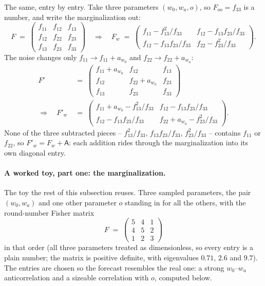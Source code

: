 \documentclass[11pt]{article}
\begin{document}
The same, entry by entry.  Take three parameters $(w_0, w_a, o)$, so
$F_{oo} = f_{33}$ is a number, and write the marginalization out:
\begin{equation*}
  F \;=\;
  \begin{pmatrix}
    f_{11} & f_{12} & f_{13} \\
    f_{12} & f_{22} & f_{23} \\
    f_{13} & f_{23} & f_{33}
  \end{pmatrix}
  \quad\Longrightarrow\quad
  F_w \;=\;
  \begin{pmatrix}
    f_{11} - f_{13}^2/f_{33} & f_{12} - f_{13}f_{23}/f_{33} \\
    f_{12} - f_{13}f_{23}/f_{33} & f_{22} - f_{23}^2/f_{33}
  \end{pmatrix} .
\end{equation*}
The noise changes only $f_{11} \to f_{11} + a_{w_0}$ and
$f_{22} \to f_{22} + a_{w_a}$:
\begin{align*}
  F' \;&=\;
  \begin{pmatrix}
    f_{11} + a_{w_0} & f_{12} & f_{13} \\
    f_{12} & f_{22} + a_{w_a} & f_{23} \\
    f_{13} & f_{23} & f_{33}
  \end{pmatrix}
  \\
  \Longrightarrow\quad
  F'_w \;&=\;
  \begin{pmatrix}
    f_{11} + a_{w_0} - f_{13}^2/f_{33} &
    f_{12} - f_{13}f_{23}/f_{33} \\
    f_{12} - f_{13}f_{23}/f_{33} &
    f_{22} + a_{w_a} - f_{23}^2/f_{33}
  \end{pmatrix} .
\end{align*}
None of the three subtracted pieces -- $f_{13}^2/f_{33}$,
$f_{13}f_{23}/f_{33}$, $f_{23}^2/f_{33}$ -- contains $f_{11}$ or
$f_{22}$, so $F'_w = F_w + \mathsf{A}$: each addition rides through
the marginalization into its own diagonal entry.

\paragraph{A worked toy, part one: the marginalization.}
The toy the rest of this subsection reuses.  Three sampled parameters,
the pair $(w_0, w_a)$ and one other parameter $o$ standing in for all
the others, with the round-number Fisher matrix
\begin{equation*}
  F \;=\;
  \begin{pmatrix} 5 & 4 & 1 \\ 4 & 5 & 2 \\ 1 & 2 & 3 \end{pmatrix}
\end{equation*}
in that order (all three parameters treated as dimensionless, so every
entry is a plain number; the matrix is positive definite, with
eigenvalues $0.71$, $2.6$ and $9.7$).  The entries are chosen so the
forecast resembles the real one: a strong $w_0$--$w_a$ anticorrelation
and a sizeable correlation with $o$, computed below.
\end{document}
